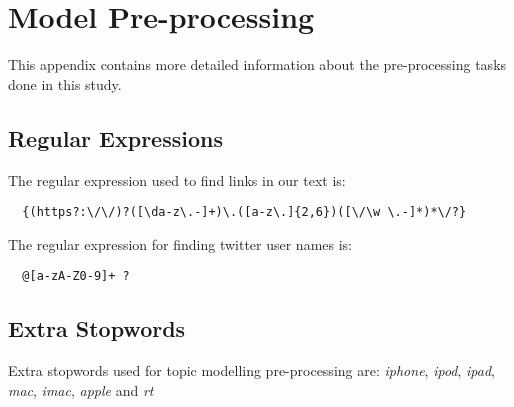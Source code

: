 \chapter{Model Pre-processing}
\label{cha:appx-model-preprocessing}
This appendix contains more detailed information about the pre-processing tasks done in this study.


\section{Regular Expressions}
\label{sec:appx-regular-expressions}
The regular expression used to find links in our text is:
\begin{verbatim}
  {(https?:\/\/)?([\da-z\.-]+)\.([a-z\.]{2,6})([\/\w \.-]*)*\/?}
\end{verbatim}

The regular expression for finding twitter user names is:
\begin{verbatim}
  @[a-zA-Z0-9]+ ?
\end{verbatim}

\section{Extra Stopwords}
\label{sec:appx-extra-stopwords}
Extra stopwords used for topic modelling pre-processing are: \textit{iphone}, \textit{ipod},
\textit{ipad}, \textit{mac}, \textit{imac}, \textit{apple} and \textit{rt}


